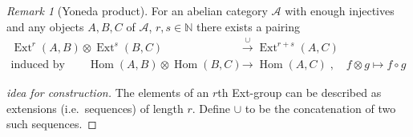 \documentclass[english]{scrartcl}
\theoremstyle{definition}
\theoremstyle{remark}
\newtheorem{Rem}[Def]{Remark}
\newcommand*{\N}{\mathds{N}}
\DeclareMathOperator{\Ext}{Ext} %
\DeclareMathOperator{\Hom}{Hom} %
\newcommand*{\idest}{i.e.\ }
\begin{document}
\begin{Rem}[Yoneda product]\label{yonedaproduct}
  For an abelian category $\mathcal{A}$ with enough injectives and
  any objects $A,B,C$ of $\mathcal{A}$, $r,s\in\N$ there exists a pairing
  \begin{align*}
    \Ext^r(A,B)\otimes\Ext^s(B,C) &\overset{\cup}{\longrightarrow}
                                    \Ext^{r+s}(A,C)
    \\
    \text{induced by}\qquad
    \Hom(A,B)\otimes\Hom(B,C) &\longrightarrow \Hom(A,C)\;,\quad
                                f\otimes g\mapsto f\circ g
  \end{align*}
  \begin{proof}[idea for construction]
    The elements of an $r$th Ext-group can be described as extensions
    (\idest sequences) of length $r$.
    Define $\cup$ to be the concatenation of two such sequences. 
  \end{proof}
\end{Rem}
\end{document}

